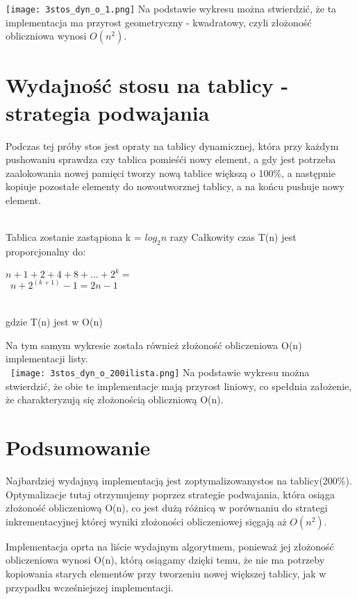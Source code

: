 \documentclass[11pt]{article}
\begin{document}
\texttt{[image: 3stos\_dyn\_o\_1.png]}
Na podstawie wykresu można stwierdzić, że ta implementacja ma przyrost geometryczny - kwadratowy, czyli złożoność obliczniowa wynosi $O(n^2)$.
\section{Wydajność stosu na tablicy - strategia podwajania}
Podczas tej próby stos jest opraty na tablicy dynamicznej, która przy każdym pushowaniu sprawdza czy tablica pomieśći nowy element, a gdy jest potrzeba zaalokowania nowej pamięci tworzy nową tablice większą o 100\%, a następnie kopiuje pozostałe elementy do nowoutworznej tablicy, a na końcu pushuje nowy element.\\\


Tablica zostanie zastąpiona k = $log_2n$ razy
Całkowity czas T(n) jest proporcjonalny do:
\begin{center}
$n+1+2+4+8+...+2^k = $\\\
$n+2^(k+1) -1 = 2n-1$\\\
\end{center}
gdzie T(n) jest w O(n)


Na tym samym wykresie została również złożoność obliczeniowa O(n) implementacji listy.\\\
\texttt{[image: 3stos\_dyn\_o\_200ilista.png]}
Na podstawie wykresu można stwierdzić, że obie te implementacje mają przyrost liniowy, co spełdnia założenie, że charakteryzują się złożonością obliczniową O(n).
\section{Podsumowanie}
Najbardziej wydajnyą implementacją jest zoptymalizowanystos na tablicy(200\%). Optymalizacje tutaj otrzymujemy poprzez strategie podwajania, która osiąga złożoność obliczeniową O(n), co jest dużą różnicą w porównaniu do strategi inkrementacyjnej której wyniki złożoności obliczeniowej sięgają aż $O(n^2)$. 

Implementacja oprta na liście wydajnym algorytmem, ponieważ jej złożoność obliczeniowa wynosi O(n), którą osiągamy dzięki temu, że nie ma potrzeby kopiowania starych elementów przy tworzeniu nowej większej tablicy, jak w przypadku wcześniejszej implementacji.
\end{document}
